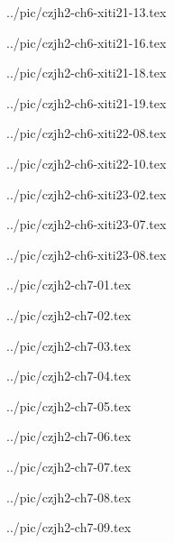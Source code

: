 ../pic/czjh2-ch6-xiti21-13.tex



../pic/czjh2-ch6-xiti21-16.tex



../pic/czjh2-ch6-xiti21-18.tex



../pic/czjh2-ch6-xiti21-19.tex



../pic/czjh2-ch6-xiti22-08.tex



../pic/czjh2-ch6-xiti22-10.tex



../pic/czjh2-ch6-xiti23-02.tex



../pic/czjh2-ch6-xiti23-07.tex



../pic/czjh2-ch6-xiti23-08.tex



../pic/czjh2-ch7-01.tex



../pic/czjh2-ch7-02.tex



../pic/czjh2-ch7-03.tex



../pic/czjh2-ch7-04.tex



../pic/czjh2-ch7-05.tex



../pic/czjh2-ch7-06.tex



../pic/czjh2-ch7-07.tex



../pic/czjh2-ch7-08.tex



../pic/czjh2-ch7-09.tex



